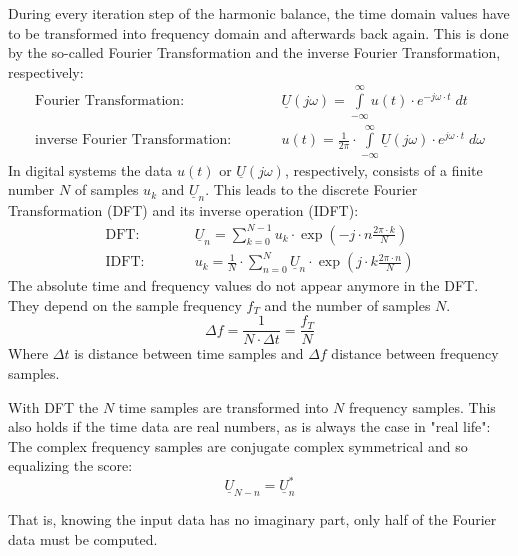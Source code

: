 During every iteration step of the harmonic balance, the time domain
values have to be transformed into frequency domain and afterwards
back again. This is done by the so-called Fourier Transformation and
the inverse Fourier Transformation, respectively:
\begin{eqnarray}
\text{Fourier Transformation:} & \qquad &
     \underline{U}(j\omega) =
     \int\limits_{-\infty}^{\infty} u(t)\cdot e^{-j\omega\cdot t} \; dt \\
\text{inverse Fourier Transformation:} & \qquad &
     u(t) = \frac{1}{2\pi} \cdot \int\limits_{-\infty}^{\infty}
            \underline{U}(j\omega)\cdot e^{j\omega\cdot t} \; d\omega
\end{eqnarray}
In digital systems the data $u(t)$ or $\underline{U}(j\omega)$,
respectively, consists of a finite number $N$ of samples $u_k$ and
$\underline{U}_n$. This leads to the discrete Fourier Transformation
(DFT) and its inverse operation (IDFT):
\begin{eqnarray}
\label{eqn:DFT}
\text{DFT:} & \qquad &
     \underline{U}_n =
     \sum_{k=0}^{N-1} u_k\cdot \exp\left( -j\cdot n\frac{2\pi\cdot k}{N} \right) \\
\label{eqn:IDFT}
\text{IDFT:} & \qquad &
     u_k = \frac{1}{N} \cdot \sum_{n=0}^{N}
            \underline{U}_n\cdot \exp\left( j\cdot k\frac{2\pi\cdot n}{N} \right)
\end{eqnarray}
The absolute time and frequency values do not appear anymore in the DFT.
They depend on the sample frequency $f_T$ and the number of samples $N$.
\begin{equation}
\Delta f = \frac{1}{N\cdot\Delta t} = \frac{f_T}{N}
\end{equation}
Where $\Delta t$ is distance between time samples and $\Delta f$
distance between frequency samples.

\addvspace{12pt}

With DFT the $N$ time samples are transformed into $N$ frequency samples.
This also holds if the time data are real numbers, as is always
the case in "real life": The complex frequency samples are conjugate
complex symmetrical and so equalizing the score:
\begin{equation}
\underline{U}_{N-n} = \underline{U}_n^*
\end{equation}

\addvspace{12pt}

That is, knowing the input data has no imaginary part, only half of
the Fourier data must be computed.


